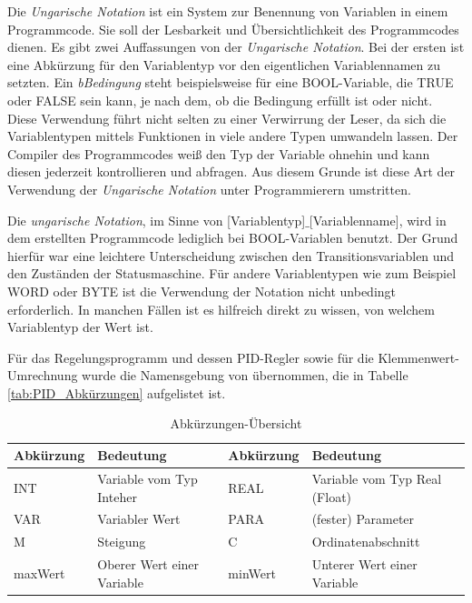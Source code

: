Die \textit{Ungarische Notation} ist ein System zur Benennung von Variablen in einem Programmcode. Sie soll der Lesbarkeit und Übersichtlichkeit des Programmcodes dienen. Es gibt zwei Auffassungen von der \textit{Ungarische Notation}. Bei der ersten ist eine Abkürzung für den Variablentyp vor den eigentlichen Variablennamen zu setzten. Ein \textit{bBedingung} steht beispielsweise für eine BOOL-Variable, die TRUE oder FALSE sein kann, je nach dem, ob die Bedingung erfüllt ist oder nicht. Diese Verwendung führt nicht selten zu einer Verwirrung der Leser,  da sich die Variablentypen mittels Funktionen in viele andere Typen umwandeln lassen. Der Compiler des Programmcodes weiß den Typ der Variable ohnehin und kann diesen jederzeit kontrollieren und abfragen. Aus diesem Grunde ist diese Art der Verwendung der \textit{Ungarische Notation} unter Programmierern umstritten. 

Die \textit{ungarische Notation}, im Sinne von [Variablentyp]$\_$[Variablenname], wird in dem erstellten Programmcode lediglich bei BOOL-Variablen benutzt. Der Grund hierfür war eine leichtere Unterscheidung zwischen den Transitionsvariablen und den Zuständen der Statusmaschine. Für andere Variablentypen wie zum Beispiel WORD oder BYTE ist die Verwendung der Notation nicht unbedingt erforderlich. In manchen Fällen ist es hilfreich direkt zu wissen, von welchem Variablentyp der Wert ist. 

Für das Regelungsprogramm und dessen PID-Regler sowie für die Klemmenwert-Umrechnung wurde die Namensgebung von \textsc{\citeauthor{Nuerenberg2015}} übernommen, die in Tabelle \ref{tab:PID_Abkürzungen} aufgelistet ist. 



\begin{table}[htb]
\centering
\caption{Abkürzungen-Übersicht \citep{Nuerenberg2015}}\vspace{6pt}
\begin{tabular}{llll}
\hline 
\rule[-1ex]{0pt}{2.5ex} \textbf{Abkürzung} & \textbf{Bedeutung} & \textbf{Abkürzung} & \textbf{Bedeutung} \\ 
\hline
\hline  
\rule[-1ex]{0pt}{2.5ex} INT & Variable vom Typ Inteher & REAL & Variable vom Typ Real (Float) \\ 
\hline 
\rule[-1ex]{0pt}{2.5ex} VAR & Variabler Wert & PARA & (fester) Parameter \\ 
\hline 
\rule[-1ex]{0pt}{2.5ex} M & Steigung & C & Ordinatenabschnitt \\ 
\hline 
\rule[-1ex]{0pt}{2.5ex} maxWert & Oberer Wert einer Variable & minWert & Unterer Wert einer Variable \\ 
\hline 
\hline
\end{tabular} 
\label{tab:Namenskonzept Nuerenberg}
\end{table}


